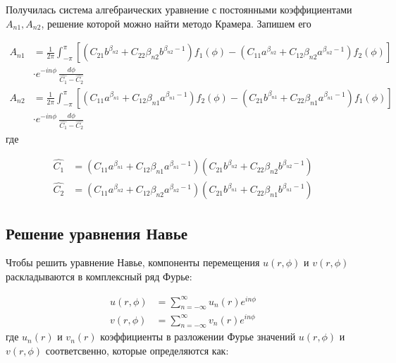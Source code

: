  
 Получилась система алгебраических уравнение с постоянными коэффициентами \(A_{n1}, A_{n2}\), решение которой можно найти методо Крамера. Запишем его
 
 \begin{equation}
	\label{eq:ch2:equation22}
	\begin{split}
		A_{n1} & = \frac{1}{2\pi} \int_{-\pi}^{\pi} \left [ \left ( C_{21} b^{\beta_{n2}} +C_{22} \beta_{n2} b^{\beta_{n2} -1}  \right ) f_1(\phi) - \left ( C_{11} a^{\beta_{n2}}+ C_{12} \beta_{n2} a^{\beta_{n2} -1}  \right ) f_2(\phi) \right ] \\ &\cdot e^{-in\phi}\,\frac{d\phi}{\hat{C_1} - \hat{C_2}}
		\\
		A_{n2} & =\frac{1}{2\pi} \int_{-\pi}^{\pi} \left [ \left( C_{11} a^{\beta_{n1}} +C_{12} \beta_{n1} a^{\beta_{n1} -1}  \right ) f_2(\phi) - \left( C_{21} b^{\beta_{n1}} +C_{22} \beta_{n1} a^{\beta_{n1} -1} \right ) f_1(\phi) \right ] \\
		& \cdot e^{-in\phi}\,\frac{d\phi}{\hat{C_1} - \hat{C_2}}
	\end{split}
\end{equation} 
 где
 
 \begin{equation}
\label{eq:ch2:equation23}
 \begin{split}
 	\hat{C_1} & =\left (C_{11} a^{\beta_{n1}} +C_{12} \beta_{n1} a^{\beta_{n1} -1} \right ) \left ( C_{21} b^{\beta_{n2}} +C_{22} \beta_{n2} b^{\beta_{n2} -1} \right )\\
 	\hat{C_2} & = \left (C_{11} a^{\beta_{n2}} +C_{12} \beta_{n2} a^{\beta_{n2} -1} \right ) \left (C_{21} b^{\beta_{n1}} +C_{22} \beta_{n1} b^{\beta_{n1} -1} \right )
 \end{split}
 \end{equation} 
 
\subsection{Решение уравнения Навье}
\label{ch:ch2/sec2:sub2} 

Чтобы решить уравнение Навье, компоненты перемещения \(u(r, \phi) \) и \(v(r, \phi) \) раскладываются в комплексный ряд Фурье:

\begin{equation}
\label{eq:ch2:equation24}
\begin{split}
	u(r, \phi) &= \sum_{n=-\infty}^{\infty} u_n(r) e^{in\phi}\\
	v(r, \phi) &= \sum_{n=-\infty}^{\infty} v_n(r) e^{in\phi}
\end{split}
\end{equation}
где \(u_n(r)\) и \(v_n(r)\) коэффициенты в разложении Фурье значений \(u(r, \phi)\) и \(v(r, \phi)\) соответсвенно, которые определяются как:

